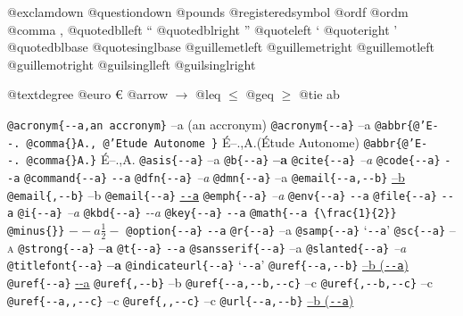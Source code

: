 \documentclass{book}
\newcommand\GNUTexinfocommandstyletextcite[1]{{\normalfont{}\textsl{#1}}}%
\begin{document}
@exclamdown \textexclamdown{}
@questiondown \textquestiondown{}
@pounds \textsterling{}
@registeredsymbol \circledR{}
@ordf \textordfeminine{}
@ordm \textordmasculine{}
@comma ,
@quotedblleft \textquotedblleft{}
@quotedblright \textquotedblright{}
@quoteleft \textquoteleft{}
@quoteright \textquoteright{}
@quotedblbase \quotedblbase{}
@quotesinglbase \quotesinglbase{}
@guillemetleft \guillemotleft{}
@guillemetright \guillemotright{}
@guillemotleft \guillemotleft{}
@guillemotright \guillemotright{}
@guilsinglleft \guilsinglleft{}
@guilsinglright \guilsinglright{}

@textdegree \textdegree{}
@euro \euro{}
@arrow $\rightarrow{}$
@leq $\leq{}$
@geq $\geq{}$
@tie a\hbox{}b

\texttt{@acronym\{{-}{-}a,an accronym\}} --a (an accronym)
\texttt{@acronym\{{-}{-}a\}} --a
\texttt{@abbr\{@'E{-}{-}.\ @comma\{\}A.,\ @'Etude Autonome \}} \'{E}--.\@ ,A.\@ (\'{E}tude Autonome)
\texttt{@abbr\{@'E{-}{-}.\ @comma\{\}A.\}} \'{E}--.\@ ,A.\@
\texttt{@asis\{{-}{-}a\}} --a
\texttt{@b\{{-}{-}a\}} \textbf{--a}
\texttt{@cite\{{-}{-}a\}} \GNUTexinfocommandstyletextcite{--a}
\texttt{@code\{{-}{-}a\}} \texttt{{-}{-}a}
\texttt{@command\{{-}{-}a\}} \texttt{{-}{-}a}
\texttt{@dfn\{{-}{-}a\}} \textsl{--a}
\texttt{@dmn\{{-}{-}a\}} \thinspace --a
\texttt{@email\{{-}{-}a,{-}{-}b\}} \href{mailto:--a}{--b}
\texttt{@email\{,{-}{-}b\}} --b
\texttt{@email\{{-}{-}a\}} \href{mailto:--a}{\nolinkurl{--a}}
\texttt{@emph\{{-}{-}a\}} \emph{--a}
\texttt{@env\{{-}{-}a\}} \texttt{{-}{-}a}
\texttt{@file\{{-}{-}a\}} \texttt{{-}{-}a}
\texttt{@i\{{-}{-}a\}} \textit{--a}
\texttt{@kbd\{{-}{-}a\}} {\ttfamily\textsl{{-}{-}a}}
\texttt{@key\{{-}{-}a\}} \texttt{{-}{-}a}
\texttt{@math\{{-}{-}a \{\textbackslash{}frac\{1\}\{2\}\} @minus\{\}\}} $--a {\frac{1}{2}} -$
\texttt{@option\{{-}{-}a\}} \texttt{{-}{-}a}
\texttt{@r\{{-}{-}a\}} \textnormal{--a}
\texttt{@samp\{{-}{-}a\}} `\texttt{{-}{-}a}'
\texttt{@sc\{{-}{-}a\}} \textsc{--a}
\texttt{@strong\{{-}{-}a\}} \textbf{--a}
\texttt{@t\{{-}{-}a\}} \texttt{{-}{-}a}
\texttt{@sansserif\{{-}{-}a\}} \textsf{--a}
\texttt{@slanted\{{-}{-}a\}} \textsl{--a}
\texttt{@titlefont\{{-}{-}a\}} {\huge \bfseries --a}
\texttt{@indicateurl\{{-}{-}a\}} `\texttt{{-}{-}a}'
\texttt{@uref\{{-}{-}a,{-}{-}b\}} \href{--a}{--b (\nolinkurl{--a})}
\texttt{@uref\{{-}{-}a\}} \url{--a}
\texttt{@uref\{,{-}{-}b\}} --b
\texttt{@uref\{{-}{-}a,{-}{-}b,{-}{-}c\}} --c
\texttt{@uref\{,{-}{-}b,{-}{-}c\}} --c
\texttt{@uref\{{-}{-}a{,}{,}{-}{-}c\}} --c
\texttt{@uref\{{,}{,}{-}{-}c\}} --c
\texttt{@url\{{-}{-}a,{-}{-}b\}} \href{--a}{--b (\nolinkurl{--a})}
\end{document}
